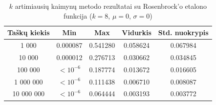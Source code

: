 \begin{table}[H]
    \centering
    \begin{tabular}{|c|c|c|c|c|}
        \hline
        \textbf{Taškų kiekis} & \textbf{Min} & \textbf{Max} & \textbf{Vidurkis} & \textbf{Std. nuokrypis} \\ \hline
        1 000        & 0.000087 & 0.541280 & 0.058624 & 0.067984 \\ \hline
        10 000       & 0.000012 & 0.276713 & 0.030662 & 0.034845 \\ \hline
        100 000      & $<10^{-6}$ & 0.187774 & 0.013672 & 0.016605 \\ \hline
        1 000 000    & $<10^{-6}$ & 0.111438 & 0.006710 & 0.008087 \\ \hline
        10 000 000   & $<10^{-6}$ & 0.064444 & 0.003193 & 0.003772 \\ \hline
    \end{tabular}
    \caption{$k$ artimiausių kaimynų metodo rezultatai su Rosenbrock'o etalono funkcija ($k = 8$, $\mu = 0$, $\sigma = 0$)}
\end{table}